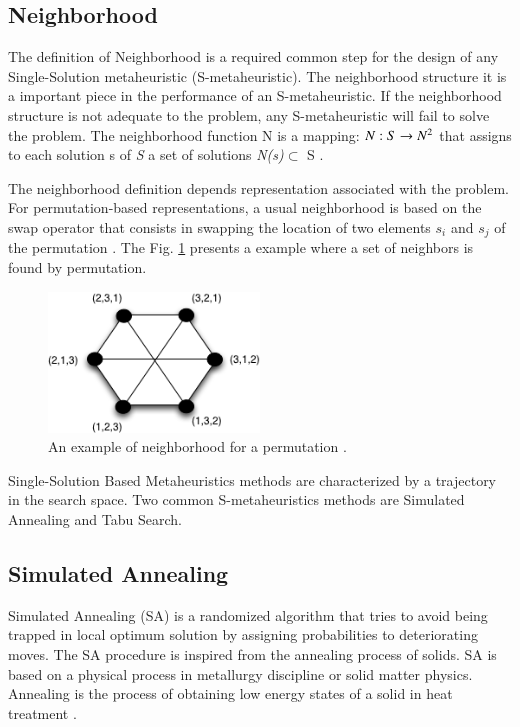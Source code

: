 \subsection{Neighborhood}

The definition of Neighborhood is a required common step for the design of any Single-Solution metaheuristic (S-metaheuristic). The neighborhood structure it is a important piece in the performance of an S-metaheuristic. If the neighborhood structure is not adequate to the problem,
any S-metaheuristic will fail to solve the problem. The neighborhood function N is a mapping: $ N : S \rightarrow N\textsuperscript{2} $ that assigns to each solution s of \textit{S} a set of solutions \textit{N(s)}$\subset$ S \cite{Talbi2013}.

The neighborhood definition depends  representation associated with the problem. For permutation-based representations, a usual neighborhood is based on the swap operator that consists in swapping the location of two elements $s_i$ and $s_j$ of the permutation \cite{Talbi2013}. The Fig. \ref{fig:sperneighborhood} presents a example where a set of neighbors is found by permutation. 


\begin{figure}[h]
\centering
\includegraphics[width=0.5\textwidth]{./images/neighborhood.png}
\caption{ An example of neighborhood for a permutation \cite{Talbi2013}.}
\label{fig:sperneighborhood}
\end{figure}



Single-Solution Based Metaheuristics methods are characterized by a trajectory in the search space. Two common S-metaheuristics methods are Simulated Annealing and Tabu Search.


\subsection{Simulated Annealing}

Simulated Annealing (SA) is a randomized algorithm that tries to avoid being trapped in local optimum solution by assigning probabilities to deteriorating moves. The SA procedure is inspired from the annealing process of solids. SA is based on a physical
process in metallurgy discipline or solid matter physics. Annealing is the process of obtaining low energy states of a solid in heat treatment \cite{Jaziri2008}. 

